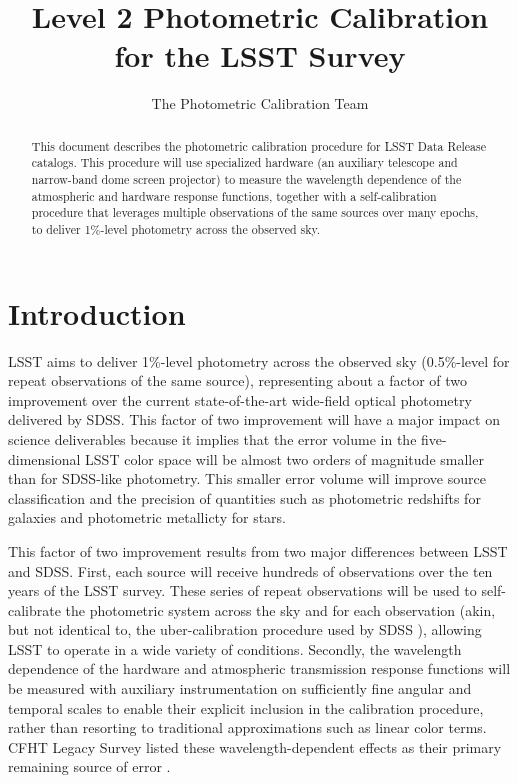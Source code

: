 \documentclass[12pt,preprint]{aastex}
\begin{document}
\title{Level 2 Photometric Calibration for the LSST Survey}

\author{
The Photometric Calibration Team
}

\begin{abstract}
This document describes the photometric calibration procedure for LSST
Data Release catalogs. This procedure will use specialized hardware
(an auxiliary telescope and narrow-band dome screen projector) to
measure the wavelength dependence of the atmospheric and hardware
response functions, together with a self-calibration procedure that
leverages multiple observations of the same sources over many epochs,
to deliver 1\%-level photometry across the observed sky.
\end{abstract}

\section{Introduction}

LSST aims to deliver 1\%-level photometry across the observed sky
(0.5\%-level for repeat observations of the same source), 
representing about a factor of two improvement over the current
state-of-the-art wide-field optical photometry delivered by SDSS. This
factor of two improvement will have a major impact on science
deliverables because it implies that the error volume in the
five-dimensional LSST color space will be almost two orders of
magnitude smaller than for SDSS-like photometry. This smaller error
volume will improve source classification and the precision of quantities
such as photometric redshifts for galaxies and photometric metallicty
for stars.

This factor of two improvement results from two major differences
between LSST and SDSS. First, each source will receive hundreds of
observations over the ten years of the LSST survey. These series of
repeat observations will be used to self-calibrate the photometric
system across the sky and for each observation (akin, but not
identical to, the uber-calibration procedure used by SDSS
\citep{Padmanabhan2008}), allowing LSST to operate in a wide variety
of conditions. Secondly, the wavelength dependence of the hardware and
atmospheric transmission response functions will be measured with
auxiliary instrumentation on sufficiently fine angular and temporal
scales to enable their explicit inclusion in the calibration
procedure, rather than resorting to traditional approximations such as
linear color terms. CFHT Legacy Survey listed these
wavelength-dependent effects as their primary remaining source of
error \citep{Regnault2009}.
\end{document}
